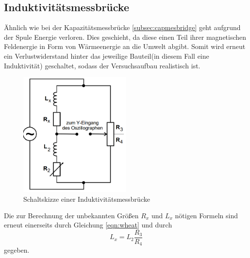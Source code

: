 \subsection{Induktivitätsmessbrücke} \label{subsec:inductance}
Ähnlich wie bei der Kapazitätsmessbrücke \ref{subsec:capmesbridge} geht aufgrund der Spule Energie verloren.
Dies geschieht, da diese einen Teil ihrer magnetischen Feldenergie in Form von Wärmeenergie an die Umwelt abgibt. Somit wird erneut ein Verlustwiderstand 
hinter das jeweilige Bauteil(in diesem Fall eine Induktivität) geschaltet, sodass der Versuchsaufbau realistisch ist.
\begin{figure}
    \centering
    \caption{Schaltskizze einer Induktivitätsmessbrücke}
    \label{fig:inductance}
    \includegraphics[width=0.5\textwidth]{bridges/inductance.png}
\end{figure}
Die zur Berechnung der unbekannten Größen $R_x$ und $L_x$ nötigen Formeln sind erneut einerseits durch Gleichung \eqref{eqn:wheat}
und durch
\begin{equation}
    L_x = L_2 \frac{R_3}{R_4}
\end{equation}
gegeben.
